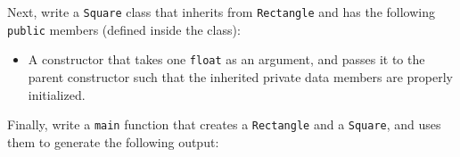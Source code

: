 Next, write a \texttt{Square} class that inherits from
\texttt{Rectangle} and has the following \texttt{public}
members (defined inside the class):
\begin{itemize}
  \item A constructor that takes one \texttt{float} as an argument,
    and passes it to the parent constructor such that the inherited private
    data members are properly initialized.
\end{itemize}

Finally, write a \texttt{main} function that creates a
\texttt{Rectangle} and a \texttt{Square}, and uses them to
generate the following output:
\inputminted[label=Output]{text}{\docCodeDir/.inheritance.gen.output.gen.section.all}

\newpage

\textQuestion{\makePageQuadrilleRuled}

\newOddPage

\textQuestion{\makePageQuadrilleRuled}
\textAnswer{~}



